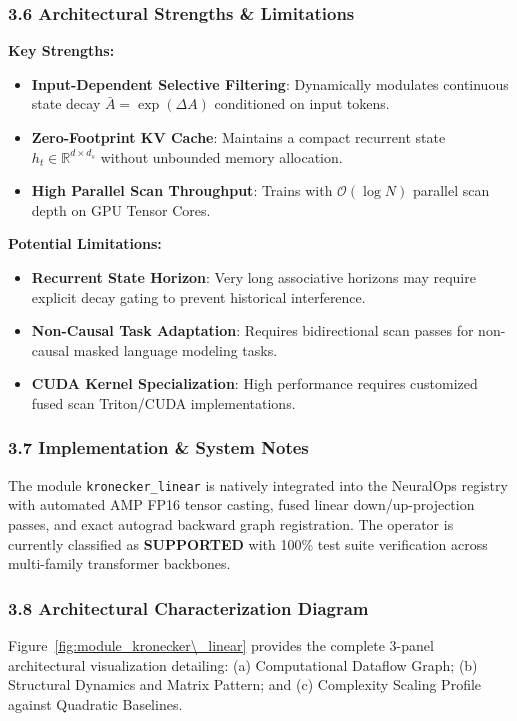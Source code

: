 \subsubsection*{3.6 Architectural Strengths \& Limitations}
\textbf{Key Strengths:}
\begin{itemize}
    \item \textbf{Input-Dependent Selective Filtering}: Dynamically modulates continuous state decay $\bar{A} = \exp(\Delta A)$ conditioned on input tokens.
    \item \textbf{Zero-Footprint KV Cache}: Maintains a compact recurrent state $h_t \in \mathbb{R}^{d \times d_s}$ without unbounded memory allocation.
    \item \textbf{High Parallel Scan Throughput}: Trains with $\mathcal{O}(\log N)$ parallel scan depth on GPU Tensor Cores.
\end{itemize}

\textbf{Potential Limitations:}
\begin{itemize}
    \item \textbf{Recurrent State Horizon}: Very long associative horizons may require explicit decay gating to prevent historical interference.
    \item \textbf{Non-Causal Task Adaptation}: Requires bidirectional scan passes for non-causal masked language modeling tasks.
    \item \textbf{CUDA Kernel Specialization}: High performance requires customized fused scan Triton/CUDA implementations.
\end{itemize}

\subsubsection*{3.7 Implementation \& System Notes}
The module \texttt{kronecker\_linear} is natively integrated into the NeuralOps registry with automated AMP FP16 tensor casting, fused linear down/up-projection passes, and exact autograd backward graph registration. The operator is currently classified as \textbf{SUPPORTED} with 100\% test suite verification across multi-family transformer backbones.

\subsubsection*{3.8 Architectural Characterization Diagram}
Figure~\ref{fig:module_kronecker\_linear} provides the complete 3-panel architectural visualization detailing: (a) Computational Dataflow Graph; (b) Structural Dynamics and Matrix Pattern; and (c) Complexity Scaling Profile against Quadratic Baselines.

